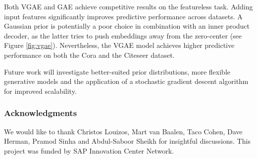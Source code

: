 \documentclass{article}
\begin{document}
\begin{table}[htp!]
\vspace{-0.5em}
  \caption{Link prediction task in citation networks. See \cite{aimag08} for dataset details.}
\vspace{0.5em}
  \label{tab:results}
  \centering
\end{table}

Both VGAE and GAE achieve competitive results on the featureless task. Adding input features significantly improves predictive performance across datasets. A Gaussian prior is potentially a poor choice in combination with an inner product decoder, as the latter tries to push embeddings away from the zero-center (see Figure \ref{fig:vgae}). Nevertheless, the VGAE model achieves higher predictive performance on both the Cora and the Citeseer dataset.

Future work will investigate better-suited prior distributions, more flexible generative models and the application of a stochastic gradient descent algorithm for improved scalability.

\subsubsection*{Acknowledgments}

We would like to thank Christos Louizos, Mart van Baalen, Taco Cohen, Dave Herman, Pramod Sinha and Abdul-Saboor Sheikh for insightful discussions. This project was funded by SAP Innovation Center Network.


\end{document}
